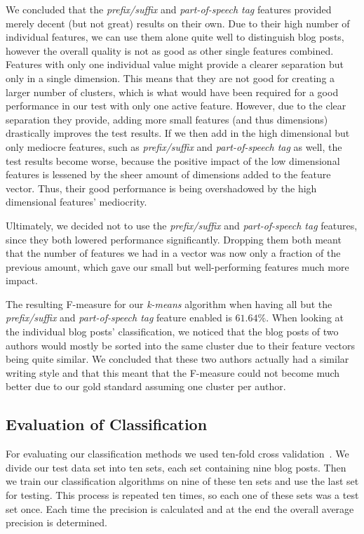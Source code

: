 We concluded that the \textit{prefix/suffix} and \textit{part-of-speech tag} features provided merely decent (but not great) results on their own.
Due to their high number of individual features, we can use them alone quite well to distinguish blog posts, however the overall quality is not as good as other single features combined.
Features with only one individual value might provide a clearer separation but only in a single dimension.
This means that they are not good for creating a larger number of clusters, which is what would have been required for a good performance in our test with only one active feature.
However, due to the clear separation they provide, adding more small features (and thus dimensions) drastically improves the test results.
If we then add in the high dimensional but only mediocre features, such as \textit{prefix/suffix} and \textit{part-of-speech tag} as well, the test results become worse, because the positive impact of the low dimensional features is lessened by the sheer amount of dimensions added to the feature vector.
Thus, their good performance is being overshadowed by the high dimensional features' mediocrity.


Ultimately, we decided not to use the \textit{prefix/suffix} and \textit{part-of-speech tag} features, since they both lowered performance significantly.
Dropping them both meant that the number of features we had in a vector was now only a fraction of the previous amount, which gave our small but well-performing features much more impact.


The resulting F-measure for our \textit{k-means} algorithm when having all but the \textit{prefix/suffix} and \textit{part-of-speech tag} feature enabled is $61.64\%$.
When looking at the individual blog posts' classification, we noticed that the blog posts of two authors would mostly be sorted into the same cluster due to their feature vectors being quite similar.
We concluded that these two authors actually had a similar writing style and that this meant that the F-measure could not become much better due to our gold standard assuming one cluster per author.


\subsection{Evaluation of Classification}
\label{sec:evaluation_classification}

For evaluating our classification methods we used ten-fold cross validation~\cite{kohavi1995study}.
We divide our test data set into ten sets, each set containing nine blog posts.
Then we train our classification algorithms on nine of these ten sets and use the last set for testing.
This process is repeated ten times, so each one of these sets was a test set once.
Each time the precision is calculated and at the end the overall average precision is determined.



